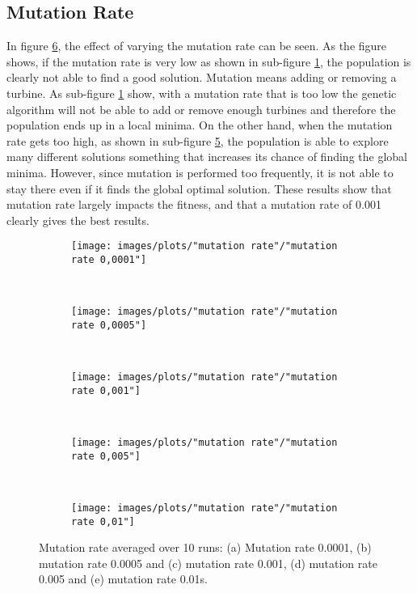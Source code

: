 \subsection{Mutation Rate}
In figure \ref{plot:mutation rate}, the effect of varying the mutation rate can be seen. As the figure shows, if the mutation rate is very low as shown in sub-figure \ref{plot:mutation rate 0.0001}, the population is clearly not able to find a good solution. Mutation means adding or removing a turbine. As sub-figure \ref{plot:mutation rate 0.0001} show, with a mutation rate that is too low the genetic algorithm will not be able to add or remove enough turbines and therefore the population ends up in a local minima. On the other hand, when the mutation rate gets too high, as shown in sub-figure \ref{plot:mutation rate 0.01}, the population is able to explore many different solutions something that increases its chance of finding the global minima. However, since mutation is performed too frequently, it is not able to stay there even if it finds the global optimal solution. These results show that mutation rate largely impacts the fitness, and that a mutation rate of 0.001 clearly gives the best results.


\begin{figure}[h!]
    \centering
      \begin{subfigure}[b]{0.31\textwidth}
        \texttt{[image: images/plots/"mutation rate"/"mutation rate 0,0001"]}
        \caption{}
        \hfill
        \label{plot:mutation rate 0.0001}
    \end{subfigure}
    ~
      \begin{subfigure}[b]{0.31\textwidth}
        \texttt{[image: images/plots/"mutation rate"/"mutation rate 0,0005"]}
        \caption{}
        \hfill
        \label{plot:mutation rate 0.0005}
    \end{subfigure}
    ~
    \begin{subfigure}[b]{0.31\textwidth}
        \texttt{[image: images/plots/"mutation rate"/"mutation rate 0,001"]}
        \caption{}
        \hfill
        \label{plot:mutation rate 0.001}
    \end{subfigure}
    ~
    \begin{subfigure}[b]{0.31\textwidth}
        \texttt{[image: images/plots/"mutation rate"/"mutation rate 0,005"]}
        \caption{}
        \hfill
        \label{plot:mutation rate 0.005}
    \end{subfigure}
    ~
    \begin{subfigure}[b]{0.31\textwidth}
        \texttt{[image: images/plots/"mutation rate"/"mutation rate 0,01"]}
        \caption{}
        \hfill
        \label{plot:mutation rate 0.01}
    \end{subfigure}
    \caption{Mutation rate averaged over 10 runs: (a) Mutation rate 0.0001, (b) mutation rate 0.0005 and (c) mutation rate 0.001, (d) mutation rate 0.005 and (e) mutation rate 0.01s.}
    \label{plot:mutation rate}
\end{figure}


